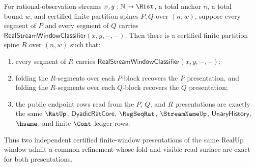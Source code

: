 \begin{theorem}
\label{thm:real-stream-window-common-refinement-exactness}
For rational-observation streams $x,y:\mathbb{N}\to\Hist$, a total anchor $n$,
a total bound $w$, and certified finite partition spines $P,Q$ over $(n,w)$,
suppose every segment of $P$ and every segment of $Q$ carries
$\mathsf{RealStreamWindowClassifier}(x,y,-,-)$. Then there is a certified
finite partition spine $R$ over $(n,w)$ such that:
\begin{enumerate}
  \item every segment of $R$ carries
  $\mathsf{RealStreamWindowClassifier}(x,y,-,-)$;
  \item folding the $R$-segments over each $P$-block recovers the $P$
  presentation, and folding the $R$-segments over each $Q$-block recovers the
  $Q$ presentation;
  \item the public endpoint rows read from the $P$, $Q$, and $R$
  presentations are exactly the same $\RatUp$, $\mathsf{DyadicRatCore}$,
  $\RegSeqRat$, $\StreamNameUp$, $\mathsf{UnaryHistory}$, $\hsame$, and finite
  $\Cont$ ledger rows.
\end{enumerate}
Thus two independent certified finite-window presentations of the same
RealUp window admit a common refinement whose fold and visible read surface
are exact for both presentations.
\end{theorem}
